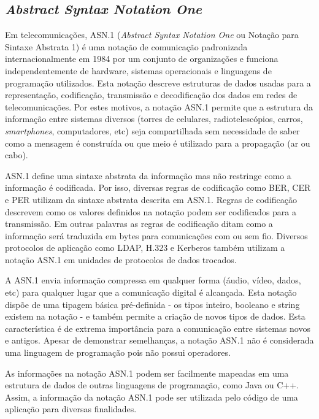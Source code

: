 \documentclass[
12pt,				%
openright,			%
oneside,			%
a4paper,			%
brazil,				%
]{abntex2}
\begin{document}
{\begin{anexosenv}
	    \partanexos
	
	\chapter{\label{ASN1}\textit{Abstract Syntax Notation One}}
	
	\par Em telecomunicações, ASN.1 (\textit{Abstract Syntax Notation One} ou Notação para Sintaxe Abstrata 1) é uma notação de comunicação padronizada internacionalmente em 1984 por um conjunto de organizações e funciona independentemente de hardware, sistemas operacionais e linguagens de programação utilizados. Esta notação descreve estruturas de dados usadas para a representação, codificação, transmissão e decodificação dos dados em redes de telecomunicações. Por estes motivos, a notação ASN.1 permite que a estrutura da informação entre sistemas diversos (torres de celulares, radiotelescópios, carros, \textit{smartphones}, computadores, etc) seja compartilhada sem necessidade de saber como a mensagem é construída ou que meio é utilizado para a propagação (ar ou cabo).
	
	\par ASN.1 define uma sintaxe abstrata da informação mas não restringe como a informação é codificada. Por isso, diversas regras de codificação como BER, CER e PER utilizam da sintaxe abstrata descrita em ASN.1. Regras de codificação descrevem como os valores definidos na notação podem ser codificados para a transmissão. Em outras palavras as regras de codificação ditam como a informação será traduzida em bytes para comunicações com ou sem fio. Diversos protocolos de aplicação como LDAP, H.323 e Kerberos também utilizam a notação ASN.1 em unidades de protocolos de dados trocados.
	
	\par A ASN.1 envia informação compressa em qualquer forma (áudio, vídeo, dados, etc) para qualquer lugar que a comunicação digital é alcançada. Esta notação dispõe de uma tipagem básica pré-definida - os tipos inteiro, booleano e string existem na notação - e também permite a criação de novos tipos de dados. Esta característica é de extrema importância para a comunicação entre sistemas novos e antigos. Apesar de demonstrar semelhanças, a notação ASN.1 não é considerada uma linguagem de programação pois não possui operadores.
	
	\par As informações na notação ASN.1 podem ser facilmente mapeadas em uma estrutura de dados de outras linguagens de programação, como Java ou C++. Assim, a informação da notação ASN.1 pode ser utilizada pelo código de uma aplicação para diversas finalidades.
	

\end{anexosenv}}
\end{document}
